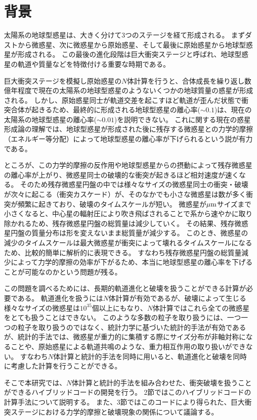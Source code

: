 \documentclass[a4paper,10pt,oneside,twocolumn,notitlepage,final]{jarticle}
\begin{document}
\section{背景}
太陽系の地球型惑星は、大きく分けて3つのステージを経て形成される。
まずダストから微惑星、次に微惑星から原始惑星、そして最後に原始惑星から地球型惑星が形成される。
この最後の進化段階は巨大衝突ステージと呼ばれ、地球型惑星の軌道や質量などを特徴付ける重要な時期である。
\par
巨大衝突ステージを模擬し原始惑星の$N$体計算を行うと、合体成長を繰り返し数億年程度で現在の太陽系の地球型惑星のようないくつかの地球質量の惑星が形成される\citep[e.g.,][]{Chambers_Wetherill_1998,Agnor_etal_1999,Kominami_Ida_2002,Kokubo_etal_2006}。
しかし、原始惑星同士が軌道交差を起こすほど軌道が歪んだ状態で衝突合体が起きるため、最終的に形成される地球型惑星の離心率($\sim0.1$)は、現在の太陽系の地球型惑星の離心率($\sim0.01$)を説明できない。
これに関する現在の惑星形成論の理解では、地球型惑星が形成された後に残存する微惑星との力学的摩擦（エネルギー等分配）によって地球型惑星の離心率が下げられるという説が有力である\citep{Morishima_etal_2010}。
\par
ところが、この力学的摩擦の反作用や地球型惑星からの摂動によって残存微惑星の離心率が上がり、微惑星同士の破壊的な衝突が起きるほど相対速度が速くなる。
そのため残存微惑星円盤の中では様々なサイズの微惑星同士の衝突・破壊が次々に起こる（衝突カスケード）が、そのなかでも小さな微惑星は数が多く衝突が頻繁に起きており、破壊のタイムスケールが短い。
微惑星が$\mu {\rm m}$サイズまで小さくなると、中心星の輻射圧により吹き飛ばされることで系から速やかに取り除かれるため、残存微惑星円盤の総質量は減少していく。
その結果、残存微惑星円盤の質量分布は形を変えないまま総質量が減少する\citep[e.g.,][]{Tanaka_etal_1996}。
このとき、微惑星の減少のタイムスケールは最大微惑星が衝突によって壊れるタイムスケールになるため、比較的簡単に解析的に表現できる\citep{Kobayashi_Tanaka_2010}。
すなわち残存微惑星円盤の総質量減少によって力学的摩擦の効率が下がるため、本当に地球型惑星の離心率を下げることが可能なのかという問題が残る。
\par
この問題を調べるためには、長期的軌道進化と破壊を扱うことができる計算が必要である。
軌道進化を扱うには$N$体計算が有効であるが、破壊によって生じる様々なサイズの微惑星は$10^{35}$個以上にもなり、$N$体計算ではこれら全ての微惑星をとても扱うことはできない。
このような多数の粒子を取り扱うには、一つ一つの粒子を取り扱うのではなく、統計力学に基づいた統計的手法が有効であるが、統計的手法では、微惑星が重力的に集積する際にサイズ分布が非軸対称になることや、原始惑星による軌道共鳴のような、重力相互作用の取り扱いができない。
すなわち$N$体計算と統計的手法を同時に用いると、軌道進化と破壊を同時に考慮した計算を行うことができる。
\par
そこで本研究では、$N$体計算と統計的手法を組み合わせた、衝突破壊を扱うことができるハイブリッドコードの開発を行う。
2節ではこのハイブリッドコードの計算手法について説明する。
また、3節ではこのコードにより得られた、巨大衝突ステージにおける力学的摩擦と破壊現象の関係について議論する。
\end{document}

